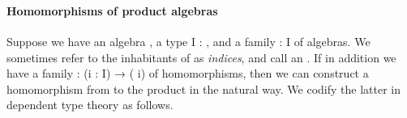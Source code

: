 \begin{code}
\AgdaSpace{}%
\AgdaSpace{}%
\AgdaSymbol{(}\AgdaSpace{}%
\AgdaSpace{}%
\AgdaSpace{}%
\AgdaSymbol{)}\<%
\\
%
\>[1]\AgdaSpace{}%
\AgdaSymbol{=}\AgdaSpace{}%
\AgdaSpace{}%
\AgdaSpace{}%
\AgdaSpace{}%
\AgdaOperator{\AgdaInductiveConstructor{,}}%
\>[28]\AgdaSpace{}%
\AgdaSymbol{\{}\AgdaSpace{}%
\AgdaSpace{}%
\AgdaSymbol{=}\AgdaSpace{}%
\AgdaSpace{}%
\AgdaSpace{}%
\<%
\\
%
\>[28]\AgdaSymbol{;}\AgdaSpace{}%
\AgdaSpace{}%
\AgdaSymbol{=}\AgdaSpace{}%
\AgdaSpace{}%
\AgdaSymbol{\{}\AgdaSymbol{\}}\AgdaSpace{}%
\AgdaSpace{}%
\AgdaSpace{}%
\AgdaSymbol{(}\AgdaSpace{}%
\AgdaSpace{}%
\AgdaSpace{}%
\AgdaSpace{}%
\AgdaSymbol{)}\AgdaSpace{}%
\AgdaSymbol{(}\AgdaSpace{}%
\AgdaSymbol{)}\AgdaSpace{}%
\AgdaSymbol{\}}\<%
\end{code}

\paragraph*{Homomorphisms of product algebras}
Suppose we have an algebra , a type \ab I :  , and a family  :
\ab I     of algebras.
We sometimes refer to the inhabitants of  as \emph{indices}, and call  an
. If in addition we have a family  : (\ab i : \ab
I) →   ( \ab i) of homomorphisms, then we can construct a homomorphism
from  to the product   in the natural way.  We codify the latter in
dependent type theory as follows.

